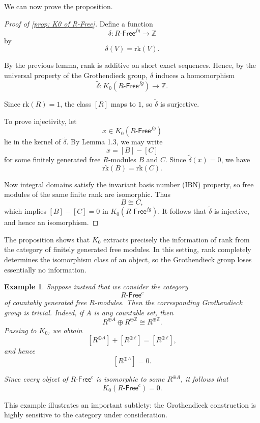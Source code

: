 \documentclass[12pt,reqno]{amsart}
\theoremstyle{plain}
\newtheorem*{ex}{Example}
\numberwithin{equation}{section}
\begin{document}
We can now prove the proposition.

\begin{proof}[Proof of \cref{prop: K0 of R-Free}]
Define a function
\[
\delta:R\textsf{-Free}^{fg}\to \mathbb Z
\]
by
\[
\delta(V)=\mathrm{rk}(V).
\]

By the previous lemma, rank is additive on short exact sequences. Hence, by the universal property of the Grothendieck group, $\delta$ induces a homomorphism
\[
\widetilde\delta:
K_0(R\textsf{-Free}^{fg})
\longrightarrow
\mathbb Z.
\]

Since $\mathrm{rk}(R)=1$, the class $[R]$ maps to $1$, so $\widetilde\delta$ is surjective.

To prove injectivity, let
\[
x\in K_0(R\textsf{-Free}^{fg})
\]
lie in the kernel of $\widetilde\delta$. By Lemma 1.3, we may write
\[
x=[B]-[C]
\]
for some finitely generated free $R$-modules $B$ and $C$. Since $\widetilde\delta(x)=0$, we have
\[
\mathrm{rk}(B)=\mathrm{rk}(C).
\]

Now integral domains satisfy the invariant basis number (IBN) property, so free modules of the same finite rank are isomorphic. Thus
\[
B\cong C,
\]
which implies $[B]-[C]=0$ in $K_0(R\textsf{-Free}^{fg})$.
It follows that $\widetilde\delta$ is injective, and hence an isomorphism.
\end{proof}

The proposition shows that $K_0$ extracts precisely the information of rank from the category of finitely generated free modules. In this setting, rank completely determines the isomorphism class of an object, so the Grothendieck group loses essentially no information.


\begin{ex}\label{ex: countable rank}
Suppose instead that we consider the category
\[
R\textsf{-Free}^c
\]
of countably generated free $R$-modules. Then the corresponding Grothendieck group is trivial.
Indeed, if $A$ is any countable set, then
\[
R^{\oplus A}\oplus R^{\oplus \mathbb Z}
\cong
R^{\oplus \mathbb Z}.
\]
Passing to $K_0$, we obtain
\[
[R^{\oplus A}]
+
[R^{\oplus \mathbb Z}]
=
[R^{\oplus \mathbb Z}],
\]
and hence
\[
[R^{\oplus A}]=0.
\]

Since every object of $R\textsf{-Free}^c$ is isomorphic to some $R^{\oplus A}$, it follows that
\[
K_0(R\textsf{-Free}^c)=0.
\]
\end{ex}

This example illustrates an important subtlety: the Grothendieck construction is highly sensitive to the category under consideration.
\end{document}

